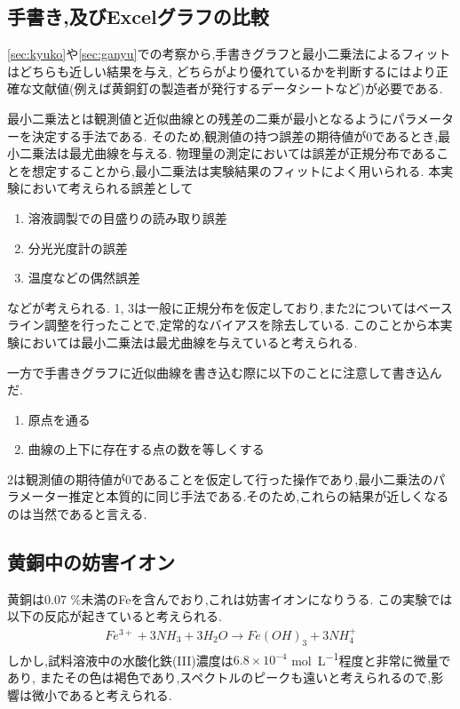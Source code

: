\subsection{手書き,及びExcelグラフの比較}
\ref{sec:kyuko}や\ref{sec:ganyu}での考察から,手書きグラフと最小二乗法によるフィットはどちらも近しい結果を与え,
どちらがより優れているかを判断するにはより正確な文献値(例えば黄銅釘の製造者が発行するデータシートなど)が必要である.

最小二乗法とは観測値と近似曲線との残差の二乗が最小となるようにパラメーターを決定する手法である.
そのため,観測値の持つ誤差の期待値が0であるとき,最小二乗法は最尤曲線を与える.
物理量の測定においては誤差が正規分布であることを想定することから,最小二乗法は実験結果のフィットによく用いられる.
本実験において考えられる誤差として
\begin{enumerate}
  \item 溶液調製での目盛りの読み取り誤差
  \item 分光光度計の誤差
  \item 温度などの偶然誤差
\end{enumerate}
などが考えられる. 1, 3は一般に正規分布を仮定しており,また2についてはベースライン調整を行ったことで,定常的なバイアスを除去している.
このことから本実験においては最小二乗法は最尤曲線を与えていると考えられる.

一方で手書きグラフに近似曲線を書き込む際に以下のことに注意して書き込んだ.
\begin{enumerate}
  \item 原点を通る
  \item 曲線の上下に存在する点の数を等しくする
\end{enumerate}
2は観測値の期待値が0であることを仮定して行った操作であり,最小二乗法のパラメーター推定と本質的に同じ手法である.そのため,これらの結果が近しくなるのは当然であると言える.
\subsection{黄銅中の妨害イオン}
黄銅は0.07 \%未満のFeを含んでおり\cite{kiso},これは妨害イオンになりうる.
この実験では以下の反応が起きていると考えられる.
\begin{align*}
  Fe^{3+} + 3NH_3 +3H_2O \rightarrow Fe(OH)_3 + 3NH_4^{+}
\end{align*}
しかし,試料溶液中の水酸化鉄(III)濃度は$6.8\times10^{-4}$ \si{\mole.L^{-1}}程度と非常に微量であり,
またその色は褐色であり,スペクトルのピークも遠いと考えられるので,影響は微小であると考えられる.
